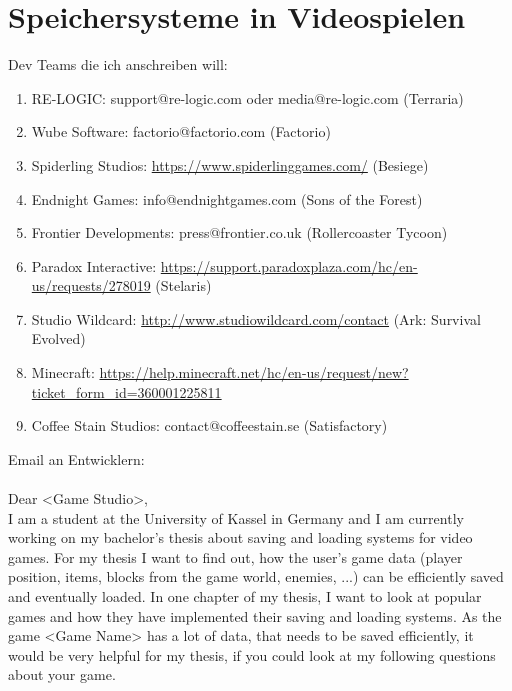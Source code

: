\chapter{Speichersysteme in Videospielen}\label{ch:videospiele}
\iffalse
Dev Teams die ich anschreiben will:
\begin{enumerate}
    \item RE-LOGIC: support@re-logic.com oder media@re-logic.com (Terraria)
    \item Wube Software: factorio@factorio.com (Factorio)
    \item Spiderling Studios: \url{https://www.spiderlinggames.com/} (Besiege)
    \item Endnight Games: info@endnightgames.com (Sons of the Forest)
    \item Frontier Developments: press@frontier.co.uk (Rollercoaster Tycoon)
    \item Paradox Interactive: \url{https://support.paradoxplaza.com/hc/en-us/requests/278019} (Stelaris)
    \item Studio Wildcard: \url{http://www.studiowildcard.com/contact} (Ark: Survival Evolved)
    \item Minecraft: \url{https://help.minecraft.net/hc/en-us/request/new?ticket_form_id=360001225811}
    \item Coffee Stain Studios: contact@coffeestain.se (Satisfactory)
\end{enumerate}

Email an Entwicklern:\\
\\
Dear <Game Studio>,\\
I am a student at the University of Kassel in Germany and I am currently working on my bachelor's thesis about saving and loading systems for video games. For my thesis I want to find out, how the user's game data (player position, items, blocks from the game world, enemies, ...) can be efficiently saved and eventually loaded. In one chapter of my thesis, I want to look at popular games and how they have implemented their saving and loading systems. As the game <Game Name> has a lot of data, that needs to be saved efficiently, it would be very helpful for my thesis, if you could look at my following questions about your game.

